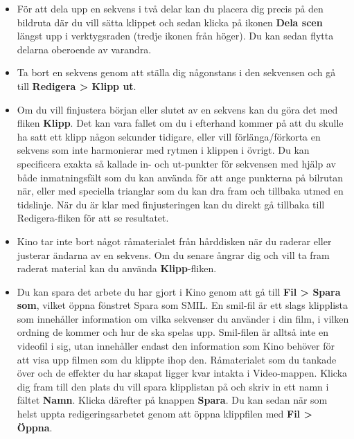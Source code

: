\documentclass[a4paper,final]{memoir} %
\begin{document}
\begin{itemize}
\begin{itemize}

\end{itemize}

\item För att dela upp en sekvens i två delar kan du placera dig precis på den bildruta där du vill sätta klippet och sedan klicka på ikonen \textbf{Dela scen} längst upp i verktygsraden (tredje ikonen från höger). Du kan sedan flytta delarna oberoende av varandra.

\item Ta bort en sekvens genom att ställa dig någonstans i den sekvensen och gå till \textbf{Redigera \textgreater{} Klipp ut}. 

\item Om du vill finjustera början eller slutet av en sekvens kan du göra det med fliken \textbf{Klipp}. Det kan vara fallet om du i efterhand kommer på att du skulle ha satt ett klipp någon sekunder tidigare, eller vill förlänga/förkorta en sekvens som inte harmonierar med rytmen i klippen i övrigt. Du kan specificera exakta så kallade in- och ut-punkter för sekvensen med hjälp av både inmatningsfält som du kan använda för att ange punkterna på bilrutan när, eller med speciella trianglar som du kan dra fram och tillbaka utmed en tidslinje. När du är klar med finjusteringen kan du direkt gå tillbaka till Redigera-fliken för att se resultatet.

\item Kino tar inte bort något råmaterialet från hårddisken när du raderar eller justerar ändarna av en sekvens. Om du senare ångrar dig och vill ta fram raderat material kan du använda \textbf{Klipp}-fliken.

\item Du kan spara det arbete du har gjort i Kino genom att gå till \textbf{Fil \textgreater{} Spara som}, vilket öppna fönstret Spara som SMIL. En smil-fil är ett slags klipplista som innehåller information om vilka sekvenser du använder i din film, i vilken ordning de kommer och hur de ska spelas upp. Smil-filen är alltså inte en videofil i sig, utan innehåller endast den information som Kino behöver för att visa upp filmen som du klippte ihop den. Råmaterialet som du tankade över och de effekter du har skapat ligger kvar intakta i Video-mappen. Klicka dig fram till den plats du vill spara klipplistan på och skriv in ett namn i fältet \textbf{Namn}. Klicka därefter på knappen \textbf{Spara}. Du kan sedan när som helst uppta redigeringsarbetet genom att öppna klippfilen med \textbf{Fil \textgreater{} Öppna}.

\end{itemize}
\end{document}
